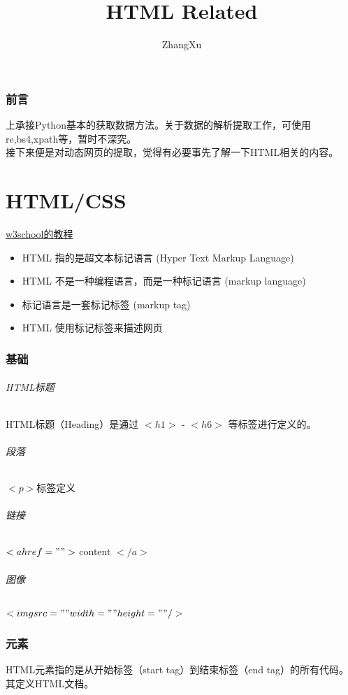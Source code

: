 \documentclass[10pt,UTF8]{ctexart}
\title{HTML Related}
\author{ZhangXu}
\begin{document}
\maketitle
{}

\section{前言}上承接Python基本的获取数据方法。关于数据的解析提取工作，可使用re,bs4,xpath等，暂时不深究。\\
\indent 接下来便是对动态网页的提取，觉得有必要事先了解一下HTML相关的内容。
\part{HTML/CSS}
\href{http://www.w3school.com.cn/html/index.asp}{w3school的教程} \\
\begin{itemize}
\item HTML 指的是超文本标记语言 (Hyper Text Markup Language)
\item HTML 不是一种编程语言，而是一种标记语言 (markup language)
\item 标记语言是一套标记标签 (markup tag)
\item HTML 使用标记标签来描述网页
\end{itemize}
\section{基础}
\paragraph{HTML标题} HTML标题（Heading）是通过 $<h1>$ - $<h6>$ 等标签进行定义的。
\paragraph{段落} $<p>$标签定义
\paragraph{链接} $<a href="">$ content $</a>$
\paragraph{图像} $<img src="" width="" height="" />$

\section{元素}
HTML元素指的是从开始标签（start tag）到结束标签（end tag）的所有代码。其定义HTML文档。
\end{document}

